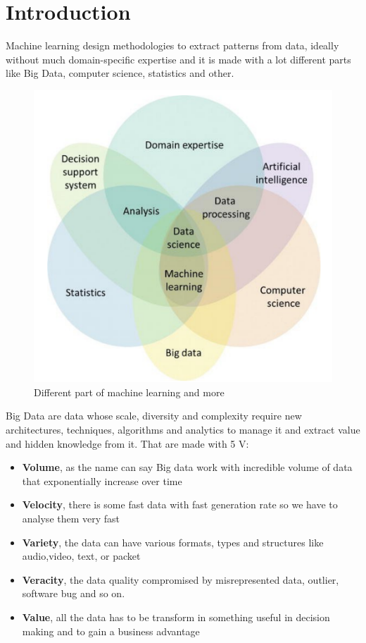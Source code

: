 \chapter{Introduction}
Machine learning design methodologies to extract patterns from data, ideally without much domain-specific expertise and it is made with a lot different parts like Big Data, computer science, statistics and other.
\begin{figure}[H]
    \centering
    \includegraphics[scale=0.5]{images/Introduction/Intro1.png}
    \caption{Different part of machine learning and more}
    \label{fig:enter-label}
\end{figure}

Big Data are data whose scale, diversity and complexity require new architectures, techniques, algorithms and analytics to manage it and extract value and hidden knowledge from it.
That are made with 5 V:
\begin{itemize}
    \item \textbf{Volume}, as the name can say Big data work with incredible volume of data that exponentially increase over time
    \item \textbf{Velocity}, there is some fast data with fast generation rate so we have to analyse them very fast
    \item \textbf{Variety}, the data can have various formats, types and structures like audio,video, text, or packet
    \item \textbf{Veracity}, the data quality compromised by misrepresented data, outlier, software bug and so on.
    \item \textbf{Value}, all the data has to be transform in something useful in decision making and to gain a business advantage
\end{itemize}

